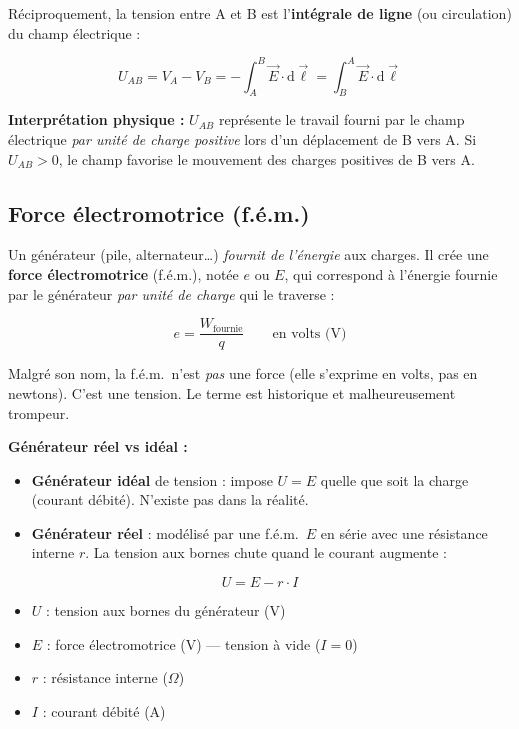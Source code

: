 \documentclass[12pt,a4paper,twoside]{book}
\begin{document}
Réciproquement, la tension entre A et B est l'\textbf{intégrale de ligne} (ou circulation) du champ électrique :

\begin{formule}
\[
\boxed{U_{AB} = V_A - V_B = -\int_A^B \vec{E}\cdot\mathrm{d}\vec{\ell} = \int_B^A \vec{E}\cdot\mathrm{d}\vec{\ell}}
\]
\end{formule}

\textbf{Interprétation physique :} $U_{AB}$ représente le travail fourni par le champ électrique \textit{par unité de charge positive} lors d'un déplacement de B vers A. Si $U_{AB} > 0$, le champ favorise le mouvement des charges positives de B vers A.

\subsection{Force électromotrice (f.é.m.)}

Un générateur (pile, alternateur\ldots) \textit{fournit de l'énergie} aux charges. Il crée une \textbf{force électromotrice} (f.é.m.), notée $e$ ou $E$, qui correspond à l'énergie fournie par le générateur \textit{par unité de charge} qui le traverse :

\[
e = \frac{W_{\text{fournie}}}{q} \qquad \text{en volts (V)}
\]

\begin{attention}
Malgré son nom, la f.é.m.\ n'est \textit{pas} une force (elle s'exprime en volts, pas en newtons). C'est une tension. Le terme est historique et malheureusement trompeur.
\end{attention}

\textbf{Générateur réel vs idéal :}
\begin{itemize}[nosep]
\item \textbf{Générateur idéal} de tension : impose $U = E$ quelle que soit la charge (courant débité). N'existe pas dans la réalité.
\item \textbf{Générateur réel} : modélisé par une f.é.m.\ $E$ en série avec une résistance interne $r$. La tension aux bornes chute quand le courant augmente :
\end{itemize}

\begin{formule}
\[
\boxed{U = E - r \cdot I}
\]
\begin{itemize}[nosep]
\item $U$ : tension aux bornes du générateur (V)
\item $E$ : force électromotrice (V) — tension à vide ($I = 0$)
\item $r$ : résistance interne ($\Omega$)
\item $I$ : courant débité (A)
\end{itemize}
\end{formule}
\end{document}
